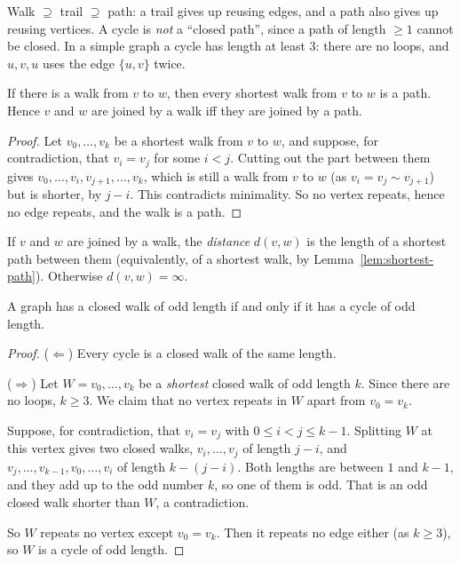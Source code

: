 \begin{note}
Walk $\supseteq$ trail $\supseteq$ path: a trail gives up reusing edges, and a path also gives up reusing vertices. A cycle is \emph{not} a ``closed path'', since a path of length $\ge1$ cannot be closed. In a simple graph a cycle has length at least $3$: there are no loops, and $u,v,u$ uses the edge $\{u,v\}$ twice.
\end{note}

\begin{lemma}
\label{lem:shortest-path}
If there is a walk from $v$ to $w$, then every shortest walk from $v$ to $w$ is a path. Hence $v$ and $w$ are joined by a walk iff they are joined by a path.
\end{lemma}
\begin{proof}
Let $v_0,\dots,v_k$ be a shortest walk from $v$ to $w$, and suppose, for contradiction, that $v_i=v_j$ for some $i<j$. Cutting out the part between them gives $v_0,\dots,v_i,v_{j+1},\dots,v_k$, which is still a walk from $v$ to $w$ (as $v_i=v_j\sim v_{j+1}$) but is shorter, by $j-i$. This contradicts minimality. So no vertex repeats, hence no edge repeats, and the walk is a path.
\end{proof}

\begin{definition}[Distance]
\label{def:distance}
If $v$ and $w$ are joined by a walk, the \emph{distance} $d(v,w)$ is the length of a shortest path between them (equivalently, of a shortest walk, by Lemma~\ref{lem:shortest-path}). Otherwise $d(v,w)=\infty$.
\end{definition}

\bigskip
\begin{theorem}[CN Thm 60]
\label{thm:odd-closed-walk}
A graph has a closed walk of odd length if and only if it has a cycle of odd length.
\end{theorem}
\begin{proof}
($\Leftarrow$) Every cycle is a closed walk of the same length.

($\Rightarrow$) Let $W=v_0,\dots,v_k$ be a \emph{shortest} closed walk of odd length $k$. Since there are no loops, $k\ge3$. We claim that no vertex repeats in $W$ apart from $v_0=v_k$.

Suppose, for contradiction, that $v_i=v_j$ with $0\le i<j\le k-1$. Splitting $W$ at this vertex gives two closed walks, $v_i,\dots,v_j$ of length $j-i$, and $v_j,\dots,v_{k-1},v_0,\dots,v_i$ of length $k-(j-i)$. Both lengths are between $1$ and $k-1$, and they add up to the odd number $k$, so one of them is odd. That is an odd closed walk shorter than $W$, a contradiction.

So $W$ repeats no vertex except $v_0=v_k$. Then it repeats no edge either (as $k\ge3$), so $W$ is a cycle of odd length.
\end{proof}

